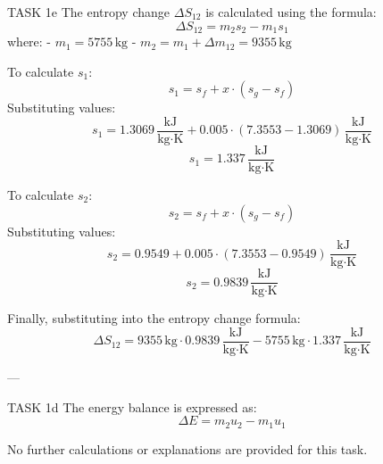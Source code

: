 TASK 1e  
The entropy change \( \Delta S_{12} \) is calculated using the formula:  
\[
\Delta S_{12} = m_{2} s_{2} - m_{1} s_{1}
\]  
where:  
- \( m_{1} = 5755 \, \text{kg} \)  
- \( m_{2} = m_{1} + \Delta m_{12} = 9355 \, \text{kg} \)  

To calculate \( s_{1} \):  
\[
s_{1} = s_f + x \cdot (s_g - s_f)
\]  
Substituting values:  
\[
s_{1} = 1.3069 \, \frac{\text{kJ}}{\text{kg·K}} + 0.005 \cdot (7.3553 - 1.3069) \, \frac{\text{kJ}}{\text{kg·K}}
\]  
\[
s_{1} = 1.337 \, \frac{\text{kJ}}{\text{kg·K}}
\]  

To calculate \( s_{2} \):  
\[
s_{2} = s_f + x \cdot (s_g - s_f)
\]  
Substituting values:  
\[
s_{2} = 0.9549 + 0.005 \cdot (7.3553 - 0.9549) \, \frac{\text{kJ}}{\text{kg·K}}
\]  
\[
s_{2} = 0.9839 \, \frac{\text{kJ}}{\text{kg·K}}
\]  

Finally, substituting into the entropy change formula:  
\[
\Delta S_{12} = 9355 \, \text{kg} \cdot 0.9839 \, \frac{\text{kJ}}{\text{kg·K}} - 5755 \, \text{kg} \cdot 1.337 \, \frac{\text{kJ}}{\text{kg·K}}
\]  

---

TASK 1d  
The energy balance is expressed as:  
\[
\Delta E = m_{2} u_{2} - m_{1} u_{1}
\]  

No further calculations or explanations are provided for this task.  

